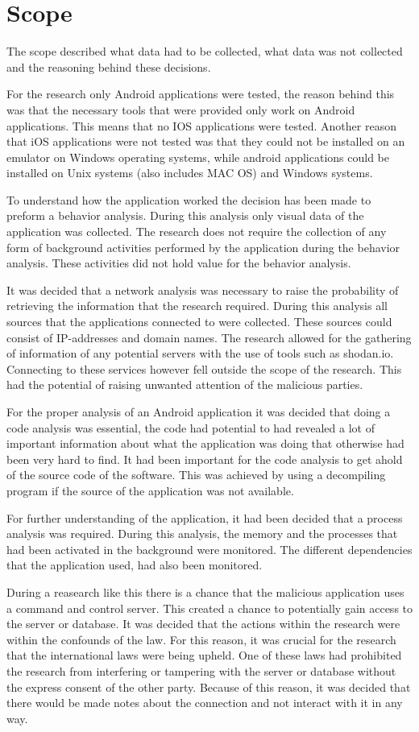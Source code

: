 \section{Scope}

The scope described what data had to be collected, what data was not collected and the reasoning behind these decisions.

For the research only Android applications were tested, the reason behind this was that the necessary tools that were provided only work on Android applications. 
This means that no IOS applications were tested. 
Another reason that iOS applications were not tested was that they could not be installed on an emulator on Windows operating systems, 
while android applications could be installed on Unix systems (also includes MAC OS) and Windows systems.

To understand how the application worked the decision has been made to preform a behavior analysis. 
During this analysis only visual data of the application was collected. 
The research does not require the collection of any form of background activities performed by the application during the behavior analysis. 
These activities did not hold value for the behavior analysis.

It was decided that a network analysis was necessary to raise the probability of retrieving the information that the research required. 
During this analysis all sources that the applications connected to were collected. These sources could consist of IP-addresses and domain names. 
The research allowed for the gathering of information of any potential servers with the use of tools such as shodan.io. 
Connecting to these services however fell outside the scope of the research. This had the potential of raising unwanted attention of the malicious parties.

For the proper analysis of an Android application it was decided that doing a code analysis was essential, 
the code had potential to had revealed a lot of important information about what the application was doing that otherwise had been very hard to find. 
It had been important for the code analysis to get ahold of the source code of the software. 
This was achieved by using a decompiling program if the source of the application was not available.

For further understanding of the application, it had been decided that a process analysis was required. 
During this analysis, the memory and the processes that had been activated in the background were monitored. 
The different dependencies that the application used, had also been monitored.

During a reasearch like this there is a chance that the malicious application uses a command and control server. 
This created a chance to potentially gain access to the server or database. It was decided that the actions within the research were within the confounds of the law. 
For this reason, it was crucial for the research that the international laws were being upheld. 
One of these laws had prohibited the research from interfering or tampering with the server or database without the express consent of the other party. 
Because of this reason, it was decided that there would be made notes about the connection and not interact with it in any way.
